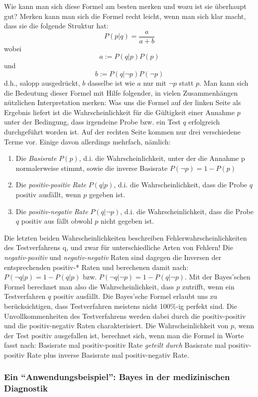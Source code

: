Wie kann man sich diese Formel am besten merken und wozu ist sie
überhaupt gut? Merken kann man sich die Formel recht leicht, wenn man
sich klar macht, dass sie die folgende Struktur hat:
\[P(p|q) = \frac{a}{a + b}\]
wobei
\[ a := P(q|p)P(p) \]
und
\[ b := P(q|\neg p)P(\neg p) \]
d.h., salopp ausgedrückt, $b$ dasselbe ist wie $a$ nur mit $\neg p$ statt $p$.
Man kann sich die Bedeutung dieser Formel mit Hilfe folgender, in
vielen Zusammenhängen nützlichen Interpretation merken: Was uns die Formel auf
der linken Seite als Ergebnis liefert ist die Wahrscheinlichkeit für die
Gültigkeit einer Annahme $p$ unter der Bedingung, dass irgendeine Probe bzw. ein
Test $q$ erfolgreich durchgeführt worden ist. Auf der rechten Seite kommen nur
drei verschiedene Terme vor. Einige davon allerdings mehrfach, nämlich:
\begin{enumerate}
  \item Die {\em Basisrate} $P(p)$, d.i. die Wahrscheinlichkeit, unter der die
  Annahme p normalerweise stimmt, sowie die inverse Basisrate $P(\neg p) = 1 -
  P(p)$
  \item Die {\em positiv-positiv Rate} $P(q|p)$, d.i. die Wahrscheinlichkeit,
  dass die Probe $q$ positiv ausfällt, wenn $p$ gegeben ist.
  \item Die {\em positiv-negativ Rate} $P(q|\neg p)$, d.i. die
  Wahrscheinlichkeit, dass die Probe $q$ positiv aus fällt obwohl $p$ nicht
  gegeben ist.
\end{enumerate}
Die letzten beiden Wahrscheinlichkeiten beschreiben Fehlerwahrscheinlichkeiten
des Testverfahrens q, und zwar für unterschiedliche Arten von Fehlern!
Die {\em negativ-positiv} und {\em negativ-negativ} Raten sind dagegen die
Inversen der entsprechenden positiv-* Raten und berechenen damit nach: $P(\neg
q|p) = 1 - P(q|p)$ bzw. $P(\neg q|\neg p) = 1-P(q|\neg p)$. Mit der Bayes'schen
Formel berechnet man also die Wahrscheinlichkeit, dass $p$ zutrifft, 
wenn ein Testverfahren $q$ positiv ausfällt. Die Bayes'sche Formel
erlaubt uns zu berücksichtigen, dass Testverfahren meistens nicht
100\%-ig perfekt sind. Die Unvollkommenheiten des Testverfahrens werden dabei
durch die positiv-positiv und die positiv-negativ Raten charakterisiert. 
Die Wahrscheinlichkeit von $p$, wenn
der Test positiv ausgefallen ist, berechnet sich, wenn man die Formel in Worte
fasst nach: Basisrate mal positiv-positiv Rate {\em
geteilt durch} Basisrate mal positiv-positiv Rate plus inverse Basisrate mal 
positiv-negativ Rate.

\subsubsection{Ein "`Anwendungsbeispiel"': Bayes in der medizinischen Diagnostik}

